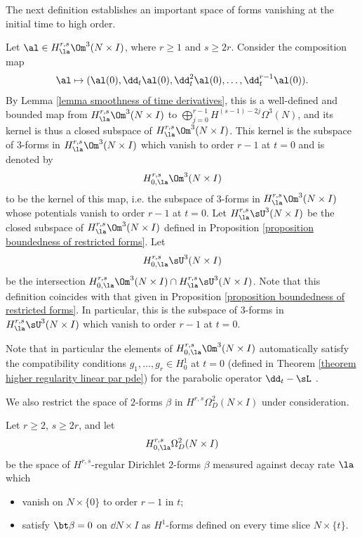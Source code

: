 \documentclass[hidelinks, 12pt, oneside, reqno]{amsart}
\begin{document}
The next definition establishes an important space of forms vanishing at the initial time to high order.

\begin{defn}\label{definition exact 3 forms vanishing on boundary}Let 
$\al \in H^{r,s}_{\la} \Om^3 (N \times I)$, where $r \ge 1$ and $s \ge 2r$. Consider the composition map
\[
\al \mapsto (\al(0),\dd_t \al(0), \dd_t^2 \al (0), \ldots, \dd_t^{r-1}\al(0) ). 
\]
\sloppy By Lemma \ref{lemma smoothness of time derivatives}, this is a well-defined and bounded map from $H^{r,s}_\la \Om^3 (N \times I)$ to $\bigoplus_{j=0}^{r-1} H^{(s-1)-2j}\Omega^3(N)$, and its kernel is thus a closed subspace of $H^{r,s}_\la \Om^3 (N \times I)$. This kernel is the subspace of 3-forms in $H^{r,s}_\la \Om^3 (N \times I)$ which vanish to order $r-1$ at $t=0$ and is denoted by 
\[
H_{0,\la}^{r,s} \Om^3 (N \times I)
\]
to be the kernel of this map, i.e. the subspace of 3-forms in $H^{r,s}_\la \Om^3 (N \times I)$ whose potentials vanish to order $r-1$ at $t=0$. Let $H^{r,s}_\la \sU^3 (N \times I)$ be the closed subspace of $H^{r,s}_\la \Om^3 (N \times I)$ defined in Proposition \ref{proposition boundedness of restricted forms}. Let
\[
H_{0,\la}^{r,s} \sU^3 (N \times I)
\]
be the intersection $H^{r,s}_{0,\la} \Om^3 (N \times I) \cap H^{r,s}_\la \sU^3 (N \times I)$. Note that this definition coincides with that given in Proposition \ref{proposition boundedness of restricted forms}. In particular, this is the subspace of 3-forms in $H^{r,s}_\la \sU^3 (N \times I)$ which vanish to order $r-1$ at $t=0$. 
\end{defn}

\begin{rmk}
Note that in particular the elements of $H_{0,\la}^{r,s} \Om^3 (N \times I)$ automatically satisfy the compatibility conditions $g_1,\ldots, g_r \in H^1_0$ at $t=0$ (defined in Theorem \ref{theorem higher regularity linear par pde}) for the parabolic operator $\dd_t - \sL$ .
\end{rmk}

We also restrict the space of $2$-forms $\beta$ in $H^{r,s}\Omega_D^2 (N \times I)$ under consideration. 
\begin{defn}\label{defn dirichlet 2 forms with vanishing boundary condition}
Let $r \ge 2$, $s \ge 2r$, and let
    \[
    H_{0,\la}^{r,s}\Omega_D^2 (N \times I)
    \]
    be the space of $H^{r,s}$-regular Dirichlet $2$-forms $\beta$ measured against decay rate $\la$ which
    \begin{itemize}
        \item vanish on $N \times \{0\}$ to order $r-1$ in $t$;
        \item satisfy $\bt \beta = 0$ on $\dd N \times I$ as $H^1$-forms defined on every time slice $N  \times \{t\}$.
    \end{itemize}
\end{defn}
\end{document}
